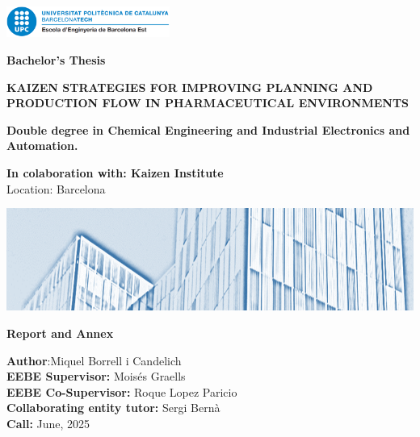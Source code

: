 \begin{titlepage}

\includegraphics[width=0.4\textwidth]{LogoUPC.png}
\begin{center}
       \vspace*{1cm}

       \textbf{Bachelor's Thesis}

       \textbf{KAIZEN STRATEGIES FOR IMPROVING PLANNING AND PRODUCTION FLOW IN PHARMACEUTICAL ENVIRONMENTS}

       \vspace{0.5cm}
        \textbf{Double degree in Chemical Engineering and Industrial Electronics and Automation.}\\
            
       \vspace{1.5cm}

       \textbf{In colaboration with: Kaizen Institute}\\
       Location: Barcelona\\

\end{center}
\includegraphics[]{BannerEEBE.png}
\begin{center}       
\textbf{Report and Annex}\\
\end{center}
       \vfill
\textbf{Author}:Miquel Borrell i Candelich\\
\textbf{EEBE Supervisor:} Moisés Graells\\
\textbf{EEBE Co-Supervisor:} Roque Lopez Paricio\\
\textbf{Collaborating entity tutor:} Sergi Bernà\\
\textbf{Call:} June, 2025\\
            
       \vspace{0.8cm}
            
\end{titlepage}
